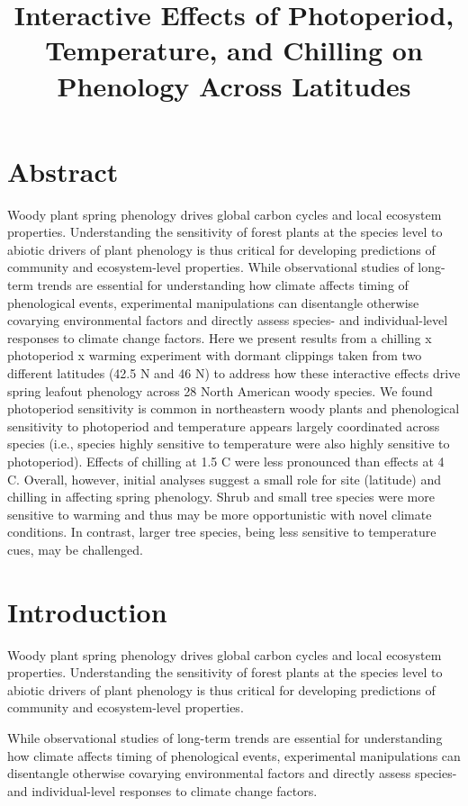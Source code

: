 \documentclass[11pt]{article}
\title{Interactive Effects of Photoperiod, Temperature, and Chilling on Phenology Across Latitudes}
\begin{document}
\maketitle
\section{Abstract}

Woody plant spring phenology drives global carbon cycles and local ecosystem properties. Understanding the sensitivity of forest plants at the species level to abiotic drivers of plant phenology is thus critical for developing predictions of community and ecosystem-level properties. While observational studies of long-term trends are essential for understanding how climate affects timing of phenological events, experimental manipulations can disentangle otherwise covarying environmental factors and directly assess species- and individual-level responses to climate change factors.
Here we present results from a chilling x photoperiod x warming experiment with dormant clippings taken from two different latitudes (42.5 N and 46 N) to address how these interactive effects drive spring leafout phenology across 28 North American woody species. We found photoperiod sensitivity is common in northeastern woody plants and phenological sensitivity to photoperiod and temperature appears largely coordinated across species (i.e., species highly sensitive to temperature were also highly sensitive to photoperiod). Effects of chilling at 1.5 C were less pronounced than effects at 4 C. Overall, however, initial analyses suggest a small role for site (latitude) and chilling in affecting spring phenology. Shrub and small tree species were more sensitive to warming and thus may be more opportunistic with novel climate conditions. In contrast, larger tree species, being less sensitive to temperature cues, may be challenged.

\section{Introduction}


Woody plant spring phenology drives global carbon cycles and local ecosystem properties. Understanding the sensitivity of forest plants at the species level to abiotic drivers of plant phenology is thus critical for developing predictions of community and ecosystem-level properties. 

While observational studies of long-term trends are essential for understanding how climate affects timing of phenological events, experimental manipulations can disentangle otherwise covarying environmental factors and directly assess species- and individual-level responses to climate change factors. 
\end{document}
